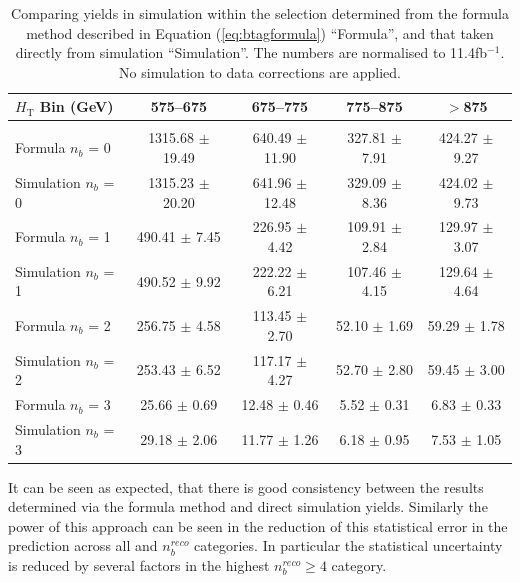 \begin{table}[ht!]
\begin{center}
\begin{tabular*}{0.95\textwidth}{@{\extracolsep{\fill}}lcccc}
\\
\hline
$H_{\textrm{T}}$ Bin (GeV)         & 575--675                  & 675--775                  & 775--875                  & $>$875                   \\ 
\hline\hline
\\
Formula $n_{b}$ = 0                & 1315.68  $\pm$  19.49     & 640.49  $\pm$  11.90      & 327.81  $\pm$  7.91       & 424.27  $\pm$  9.27      \\
Simulation $n_{b}$ = 0                & 1315.23  $\pm$  20.20     & 641.96  $\pm$  12.48      & 329.09  $\pm$  8.36       & 424.02  $\pm$  9.73      \\
\hline
Formula $n_{b}$ = 1                & 490.41  $\pm$  7.45       & 226.95  $\pm$  4.42       & 109.91  $\pm$  2.84       & 129.97  $\pm$  3.07      \\
Simulation $n_{b}$ = 1                & 490.52  $\pm$  9.92       & 222.22  $\pm$  6.21       & 107.46  $\pm$  4.15       & 129.64  $\pm$  4.64      \\
\hline
Formula $n_{b}$ = 2                & 256.75  $\pm$  4.58       & 113.45  $\pm$  2.70       & 52.10  $\pm$  1.69        & 59.29  $\pm$  1.78       \\
Simulation $n_{b}$ = 2                  & 253.43  $\pm$  6.52       & 117.17  $\pm$  4.27       & 52.70  $\pm$  2.80        & 59.45  $\pm$  3.00       \\
\hline
Formula $n_{b}$ = 3                  & 25.66  $\pm$  0.69        & 12.48  $\pm$  0.46        & 5.52  $\pm$  0.31         & 6.83  $\pm$  0.33        \\
Simulation $n_{b}$ = 3                  & 29.18  $\pm$  2.06        & 11.77  $\pm$  1.26        & 6.18  $\pm$  0.95         & 7.53  $\pm$  1.05        \\ 
\end{tabular*}
\end{center}
\caption[Comparing yields in simulation within the \mupjets selection determined from the formula method described in Equation (\ref{eq:btagformula}) ``Formula'', and that taken directly from simulation ``Simulation''.]{Comparing yields in simulation within the \mupjets selection determined from the formula method described in Equation (\ref{eq:btagformula}) ``Formula'', and that taken directly from simulation ``Simulation''. The numbers are normalised to 11.4fb$^{-1}$. No simulation to data corrections are applied.}\label{tab:sanitycheck}
\end{table}

It can be seen as expected, that there is good consistency between the results determined via the formula method and direct simulation yields. Similarly the power of this approach can be seen in the reduction of this statistical error in the prediction across all \theht and $n_{b}^{reco}$ categories. In particular the statistical uncertainty is reduced by several factors in the highest $n_{b}^{reco} \geq 4$ category.

